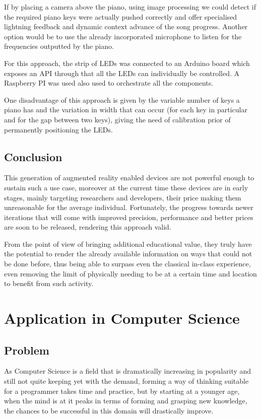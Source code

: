 \documentclass[12 pct]{report}
\begin{document}
If by placing a camera above the piano, using image processing we could detect if the required piano keys were actually pushed correctly and offer specialised lightning feedback and dynamic context advance of the song progress. Another option would be to use the already incorporated microphone to listen for the frequencies outputted by the piano.

For this approach, the strip of LEDs was connected to an Arduino board which exposes an API through that all the LEDs can individually be controlled. A Raspberry PI was used also used to orchestrate all the components.

One disadvantage of this approach is given by the variable number of keys a piano has and the variation in width that can occur (for each key in particular and for the gap between two keys), giving the need of calibration prior of permanently positioning the LEDs.

\section{Conclusion}
This generation of augmented reality enabled devices are not powerful enough to sustain such a use case, moreover at the current time these devices are in early stages, mainly targeting researchers and developers, their price making them unreasonable for the average individual. Fortunately, the progress towards newer iterations that will come with improved precision, performance and better prices are soon to be released, rendering this approach valid.

From the point of view of bringing additional educational value, they truly have the potential to render the already available information on ways that could not be done before, thus being able to surpass even the classical in-class experience, even removing the limit of physically needing to be at a certain  time and location to benefit from such activity.

\chapter{Application in Computer Science}

\section{Problem}
As Computer Science is a field that is dramatically increasing in popularity and still not quite keeping yet with the demand, forming a way of thinking suitable for a programmer takes time and practice, but by starting at a younger age, when the mind is at it peaks in terms of forming and grasping new knowledge, the chances to be successful in this domain will drastically improve.
\end{document}
